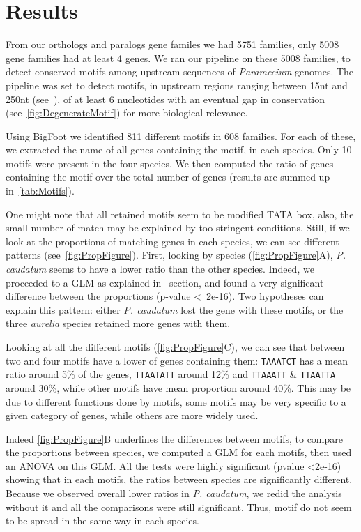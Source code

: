 \section*{Results}
\label{sec:Results}

From our orthologs and paralogs gene familes we had 5751 families, only 5008 gene families had at least 4 genes. We ran our pipeline on these 5008 families, to detect conserved motifs among upstream sequences of \textit{Paramecium} genomes. The pipeline was set to detect motifs, in upstream regions ranging between 15nt and 250nt (see~), of at least 6 nucleotides with an eventual gap in conservation (see~\autoref{fig:DegenerateMotif}) for more biological relevance.

Using BigFoot we identified 811 different motifs in 608 families. For each of these, we extracted the name of all genes containing the motif, in each species. Only 10 motifs were present in the four species. We then computed the ratio of genes containing the motif over the total number of genes (results are summed up in~\autoref{tab:Motifs}).

One might note that all retained motifs seem to be modified TATA box, also, the small number of match may be explained by too stringent conditions. Still, if we look at the proportions of matching genes in each species, we can see different patterns (see~\autoref{fig:PropFigure}). First, looking by species (\autoref{fig:PropFigure}A), \textit{P. caudatum} seems to have a lower ratio than the other species. Indeed, we proceeded to a GLM as explained in~ section, and found a very significant difference between the proportions (p-value \textless~2e-16). Two hypotheses can explain this pattern: either \textit{P. caudatum} lost the gene with these motifs, or the three \textit{aurelia} species retained more genes with them.

Looking at all the different motifs (\autoref{fig:PropFigure}C), we can see that between two and four motifs have a lower of genes containing them: \texttt{TAAATCT} has a mean ratio around 5\% of the genes, \texttt{TTAATATT} around 12\% and \texttt{TTAAATT} \& \texttt{TTAATTA} around 30\%, while other motifs have mean proportion around 40\%. This may be due to different functions done by motifs, some motifs may be very specific to a given category of genes, while others are more widely used.

Indeed \autoref{fig:PropFigure}B underlines the differences between motifs, to compare the proportions between species, we computed a GLM for each motifs, then used an ANOVA on this GLM. All the tests were highly significant (pvalue \textless 2e-16) showing that in each motifs, the ratios between species are significantly different. Because we observed overall lower ratios in \textit{P. caudatum}, we redid the analysis without it and all the comparisons were still significant. Thus, motif do not seem to be spread in the same way in each species.

